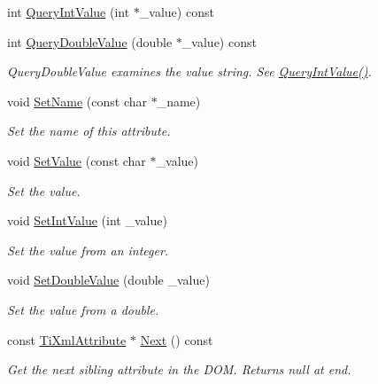 \begin{DoxyCompactItemize}
\item 
int \hyperlink{class_ti_xml_attribute_a6caa8090d2fbb7966700a16e45ed33de}{Query\+Int\+Value} (int $\ast$\+\_\+value) const
\item 
int \hyperlink{class_ti_xml_attribute_a6fa41b710c1b79de37a97004aa600c06}{Query\+Double\+Value} (double $\ast$\+\_\+value) const
\begin{DoxyCompactList}\small\item\em Query\+Double\+Value examines the value string. See \hyperlink{class_ti_xml_attribute_a6caa8090d2fbb7966700a16e45ed33de}{Query\+Int\+Value()}. \end{DoxyCompactList}\item 
void \hyperlink{class_ti_xml_attribute_ab7fa3d21ff8d7c5764cf9af15b667a99}{Set\+Name} (const char $\ast$\+\_\+name)
\begin{DoxyCompactList}\small\item\em Set the name of this attribute. \end{DoxyCompactList}\item 
void \hyperlink{class_ti_xml_attribute_a2dae44178f668b3cb48101be4f2236a0}{Set\+Value} (const char $\ast$\+\_\+value)
\begin{DoxyCompactList}\small\item\em Set the value. \end{DoxyCompactList}\item 
void \hyperlink{class_ti_xml_attribute_a7e065df640116a62ea4f4b7da5449cc8}{Set\+Int\+Value} (int \+\_\+value)
\begin{DoxyCompactList}\small\item\em Set the value from an integer. \end{DoxyCompactList}\item 
void \hyperlink{class_ti_xml_attribute_a0316da31373496c4368ad549bf711394}{Set\+Double\+Value} (double \+\_\+value)
\begin{DoxyCompactList}\small\item\em Set the value from a double. \end{DoxyCompactList}\item 
const \hyperlink{class_ti_xml_attribute}{Ti\+Xml\+Attribute} $\ast$ \hyperlink{class_ti_xml_attribute_af2e78f1ba9ed56a26ddc80614ed1c393}{Next} () const
\begin{DoxyCompactList}\small\item\em Get the next sibling attribute in the D\+OM. Returns null at end. \end{DoxyCompactList}\item 

\end{DoxyCompactItemize}
